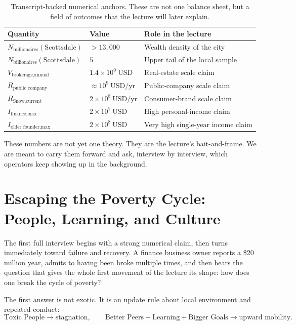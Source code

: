 \begin{table}[h]
\centering
\begin{tabular}{|l|l|l|}
\hline
Quantity & Value & Role in the lecture \\
\hline
\(N_{\text{millionaires}}(\text{Scottsdale})\) & \(>13{,}000\) & Wealth density of the city \\
\hline
\(N_{\text{billionaires}}(\text{Scottsdale})\) & \(5\) & Upper tail of the local sample \\
\hline
\(V_{\text{brokerage,annual}}\) & \(1.4\times 10^9\ \text{USD}\) & Real-estate scale claim \\
\hline
\(R_{\text{public company}}\) & \(\approx 10^9\ \text{USD/yr}\) & Public-company scale claim \\
\hline
\(R_{\text{Snow,current}}\) & \(2\times 10^8\ \text{USD/yr}\) & Consumer-brand scale claim \\
\hline
\(I_{\text{finance,max}}\) & \(2\times 10^7\ \text{USD}\) & High personal-income claim \\
\hline
\(I_{\text{older founder,max}}\) & \(2\times 10^8\ \text{USD}\) & Very high single-year income claim \\
\hline
\end{tabular}
\caption{Transcript-backed numerical anchors. These are not one balance sheet, but a field of outcomes that the lecture will later explain.}
\end{table}

These numbers are not yet one theory. They are the lecture's bait-and-frame. We are meant to carry them forward and ask, interview by interview, which operators keep showing up in the background.

\section{Escaping the Poverty Cycle: People, Learning, and Culture}

The first full interview begins with a strong numerical claim, then turns immediately toward failure and recovery. A finance business owner reports a \$20 million year, admits to having been broke multiple times, and then hears the question that gives the whole first movement of the lecture its shape: how does one break the cycle of poverty?

The first answer is not exotic. It is an update rule about local environment and repeated conduct:
\begin{equation}
\text{Toxic People} \to \text{stagnation},
\qquad
\text{Better Peers}+\text{Learning}+\text{Bigger Goals} \to \text{upward mobility}.
\end{equation}


